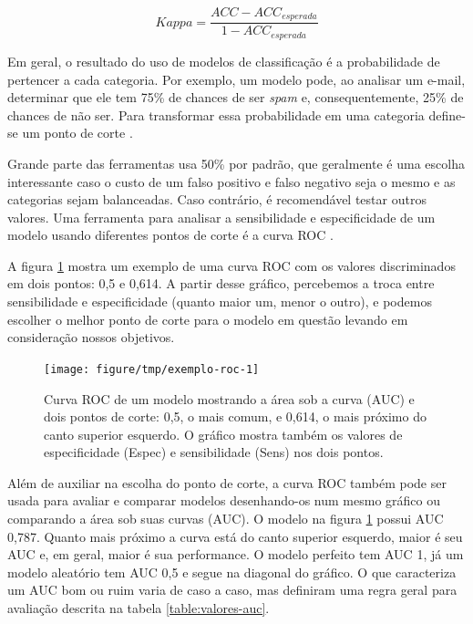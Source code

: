 \documentclass[a4paper,titlepage]{ppgi}\usepackage[]{graphicx}\usepackage[]{color}
\newenvironment{knitrout}{}{} %
\begin{document}
\begin{equation}
\label{eq:kappa}
Kappa = \frac{ACC - ACC_{esperada}}{1 - ACC_{esperada}}
\end{equation}

Em geral, o resultado do uso de modelos de classificação é a probabilidade de
pertencer a cada categoria. Por exemplo, um modelo pode, ao analisar um e-mail,
determinar que ele tem 75\% de chances de ser \emph{spam} e, consequentemente,
25\% de chances de não ser. Para transformar essa probabilidade em uma
categoria define-se um ponto de corte \cite{Kuhn2013}.

Grande parte das ferramentas usa 50\% por padrão, que geralmente é uma escolha
interessante caso o custo de um falso positivo e falso negativo seja o mesmo e
as categorias sejam balanceadas. Caso contrário, é recomendável testar outros
valores. Uma ferramenta para analisar a sensibilidade e especificidade de um
modelo usando diferentes pontos de corte é a curva \gls{ROC}
\cite{Altman1994,Brown2006,Fawcett2006}.

A figura \ref{fig:exemplo-roc} mostra um exemplo de uma curva \gls{ROC} com os
valores discriminados em dois pontos: 0,5 e 0,614. A partir desse gráfico,
percebemos a troca entre sensibilidade e especificidade (quanto maior um, menor
o outro), e podemos escolher o melhor ponto de corte para o modelo em questão
levando em consideração nossos objetivos.

\begin{knitrout}
\color{fgcolor}\begin{figure}
\texttt{[image: figure/tmp/exemplo-roc-1]} \caption[Curva ROC de um modelo mostrando a área sob a curva (AUC) e dois pontos de corte]{Curva ROC de um modelo mostrando a área sob a curva (AUC) e dois pontos de corte: 0,5, o mais comum, e 0,614, o mais próximo do canto superior esquerdo. O gráfico mostra também os valores de especificidade (Espec) e sensibilidade (Sens) nos dois pontos.}\label{fig:exemplo-roc}
\end{figure}


\end{knitrout}

Além de auxiliar na escolha do ponto de corte, a curva \gls{ROC} também pode
ser usada para avaliar e comparar modelos desenhando-os num mesmo gráfico ou
comparando a área sob suas curvas (\acrshort{AUC}). O modelo na figura
\ref{fig:exemplo-roc} possui \acrshort{AUC} 0,787. Quanto mais próximo a curva está
do canto superior esquerdo, maior é seu \acrshort{AUC} e, em geral, maior é sua
performance.  O modelo perfeito tem \acrshort{AUC} 1, já um modelo aleatório
tem \acrshort{AUC} 0,5 e segue na diagonal do gráfico. O que caracteriza um
\acrshort{AUC} bom ou ruim varia de caso a caso, mas 
definiram uma regra geral para avaliação descrita na tabela
\ref{table:valores-auc}.
\end{document}
